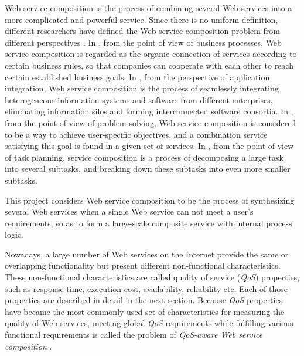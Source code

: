 Web service composition is the process of combining several Web services into a more complicated and powerful service. Since there is no uniform definition, different researchers have defined the Web service composition problem from different perspectives \cite{22,21,23,20}. In \cite{20}, from the point of view of business processes, Web service composition is regarded as the organic connection of services according to certain business rules, so that companies can cooperate with each other to reach certain established business goals. In \cite{21}, from the perspective of application integration, Web service composition is the process of seamlessly integrating heterogeneous information systems and software from different enterprises, eliminating information silos and forming interconnected software consortia. In \cite{22}, from the point of view of problem solving, Web service composition is considered to be a way to achieve user-specific objectives, and a combination service satisfying this goal is found in a given set of services. In \cite{23}, from the point of view of task planning, service composition is a process of decomposing a large task into several subtasks, and breaking down these subtasks into even more smaller subtasks.\par

This project considers Web service composition to be the process of synthesizing several Web services when a single Web service can not meet a user's requirements, so as to form a large-scale composite service with internal process logic.\par

Nowadays, a large number of Web services on the Internet provide the same or overlapping functionality but present different non-functional characteristics. These non-functional characteristics are called quality of service (\emph{QoS}) properties, such as response time, execution cost, availability, reliability etc. Each of those properties are described in detail in the next section. Because \emph{QoS} properties have became the most commonly used set of characteristics for measuring the quality of Web services, meeting global \emph{QoS} requirements while fulfilling various functional requirements is called the problem of \emph{\emph{QoS}-aware Web service composition} \cite{26,28}.



